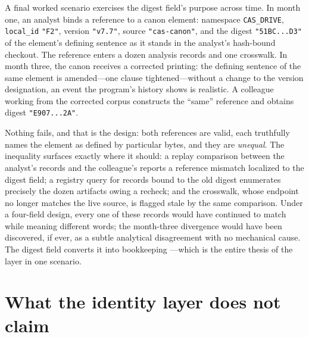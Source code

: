 \begin{example}\label{ch03:ex-drift}
A final worked scenario exercises the digest field's purpose across
time. In month one, an analyst binds a reference to a canon
element: namespace \texttt{CAS\_DRIVE}, \texttt{local\_id}
\texttt{"F2"}, version \texttt{"v7.7"}, source
\texttt{"cas-canon"}, and the digest \texttt{"51BC...D3"} of the
element's defining sentence as it stands in the analyst's
hash-bound checkout. The reference enters a dozen analysis records
and one crosswalk. In month three, the canon receives a
corrected printing: the defining sentence of the same element is
amended---one clause tightened---without a change to the version
designation, an event the program's history shows is realistic.
A colleague working from the corrected corpus constructs the
``same'' reference and obtains digest \texttt{"E907...2A"}.

Nothing fails, and that is the design: both references are valid,
each truthfully names the element as defined by particular bytes,
and they are \emph{unequal}. The inequality surfaces exactly where
it should: a replay comparison between the analyst's records and
the colleague's reports a reference mismatch localized to the
digest field; a registry query for records bound to the old digest
enumerates precisely the dozen artifacts owing a recheck; and the
crosswalk, whose endpoint no longer matches the live source, is
flagged stale by the same comparison. Under a four-field design,
every one of these records would have continued to match while
meaning different words; the month-three divergence would have
been discovered, if ever, as a subtle analytical disagreement with
no mechanical cause. The digest field converts it into bookkeeping
---which is the entire thesis of the layer in one scenario.
\end{example}

\section{What the identity layer does not claim}\label{ch03:boundary}

